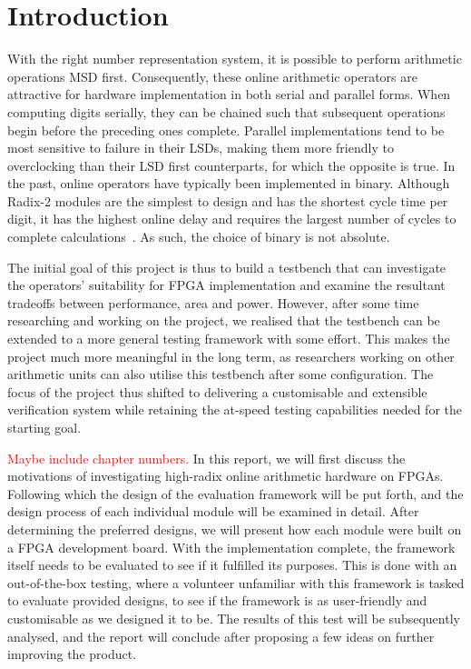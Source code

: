 \chapter{Introduction}

With the right number representation system, it is possible to perform arithmetic operations MSD first.
Consequently, these online arithmetic operators are attractive for hardware implementation in both serial and parallel forms.
When computing digits serially, they can be chained such that subsequent operations begin before the preceding ones complete.
Parallel implementations tend to be most sensitive to failure in their LSDs, making them more friendly to overclocking than their LSD first counterparts, for which the opposite is true.
In the past, online operators have typically been implemented in binary.
Although Radix-2 modules are the simplest to design and has the shortest cycle time per digit, it has the highest online delay and requires the largest number of cycles to complete calculations~\cite{Tenca1}.
As such, the choice of binary is not absolute.

The initial goal of this project is thus to build a testbench that can investigate the operators' suitability for FPGA implementation and examine the resultant tradeoffs between performance, area and power.
However, after some time researching and working on the project, we realised that the testbench can be extended to a more general testing framework with some effort.
This makes the project much more meaningful in the long term, as researchers working on other arithmetic units can also utilise this testbench after some configuration.
The focus of the project thus shifted to delivering a customisable and extensible verification system while retaining the at-speed testing capabilities needed for the starting goal.

\textcolor{red}{Maybe include chapter numbers.}
In this report, we will first discuss the motivations of investigating high-radix online arithmetic hardware on FPGAs.
Following which the design of the evaluation framework will be put forth, and the design process of each individual module will be examined in detail.
After determining the preferred designs, we will present how each module were built on a FPGA development board.
With the implementation complete, the framework itself needs to be evaluated to see if it fulfilled its purposes.
This is done with an out-of-the-box testing, where a volunteer unfamiliar with this framework is tasked to evaluate provided designs, to see if the framework is as user-friendly and customisable as we designed it to be.
The results of this test will be subsequently analysed, and the report will conclude after proposing a few ideas on further improving the product.
